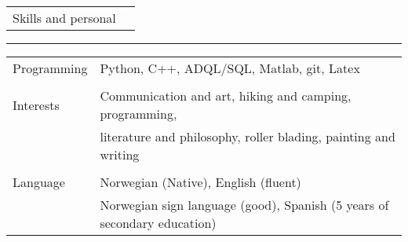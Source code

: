 \documentclass[letterpaper,9pt,oneside]{article}
\begin{document}
\vspace{2mm} 

\noindent 
\begin{tabular}{@{} l l} 
	\large{Skills and personal}\vspace{1mm}&  
\end{tabular} \hrule 
\vspace{5mm} \noindent    
 \begin{tabular}{@{} l l}
	
	Programming   \hspace{9mm} &  Python, C++, ADQL/SQL, Matlab, git, Latex \\
	& \\
	Interests & Communication and art, hiking and camping, programming, \\& literature and philosophy, roller blading, painting and writing \\ &\\ 
	Language  & Norwegian (Native), English (fluent)\\ & Norwegian sign language (good), Spanish (5 years of secondary education) \\
\end{tabular} \\
\end{document}
